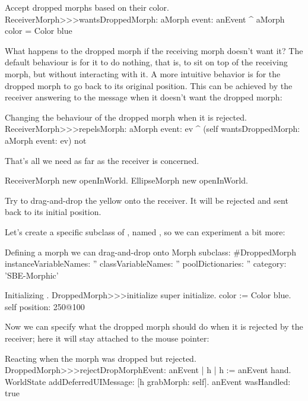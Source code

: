 \documentclass[a4paper,10pt,twoside]{book}
\begin{document}
\begin{method}{Accept dropped morphs based on their color.}
ReceiverMorph>>>wantsDroppedMorph: aMorph event: anEvent
	^ aMorph color = Color blue
\end{method}

What happens to the dropped morph if the receiving morph doesn't want it?  The default behaviour is for it to do nothing, that is, to sit on top of the receiving morph, but without interacting with it.  A more intuitive behavior is for the dropped morph to go back to its original position.  This can be achieved by the receiver answering  to the message  when it doesn't want the dropped morph:

\begin{method}{Changing the behaviour of the dropped morph when it is rejected.}
ReceiverMorph>>>repelsMorph: aMorph event: ev
	^ (self wantsDroppedMorph: aMorph event: ev) not
\end{method}

That's all we need as far as the receiver is concerned.

\begin{code}{}
ReceiverMorph new openInWorld.
EllipseMorph new openInWorld.
\end{code}
\noindent
Try to drag-and-drop the yellow  onto the receiver. It will be rejected and sent back to its initial position.


Let's create a specific subclass of , named , so we can experiment a bit more:

\begin{classdef}{Defining a morph we can drag-and-drop onto }
Morph subclass: #DroppedMorph
	instanceVariableNames: ''
	classVariableNames: ''
	poolDictionaries: ''
	category: 'SBE-Morphic'
\end{classdef}

\begin{method}{Initializing .}
DroppedMorph>>>initialize
	super initialize.
	color := Color blue.
	self position: 250@100
\end{method}

Now we can specify what the dropped morph should do when it is rejected by the receiver; here it will stay attached to the mouse pointer:
\begin{method}{Reacting when the morph was dropped but rejected.}
DroppedMorph>>>rejectDropMorphEvent: anEvent
	| h |
	h := anEvent hand.
	WorldState
		addDeferredUIMessage: [h grabMorph: self].
	anEvent wasHandled: true
\end{method}
\end{document}
